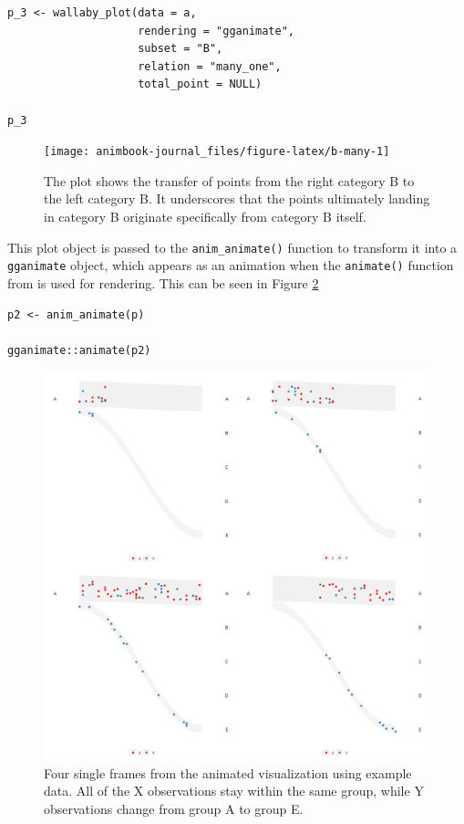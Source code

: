 \begin{verbatim}
p_3 <- wallaby_plot(data = a,
                    rendering = "gganimate",
                    subset = "B",
                    relation = "many_one",
                    total_point = NULL)

p_3
\end{verbatim}

\begin{figure}

{\centering \texttt{[image: animbook-journal\_files/figure-latex/b-many-1]} 

}

\caption{The plot shows the transfer of points from the right category B to the left category B. It underscores that the points ultimately landing in category B originate specifically from category B itself.}\label{fig:b-many}
\end{figure}

This plot object is passed to the \texttt{anim\_animate()} function to transform it into a \texttt{gganimate} object, which appears as an animation when the \texttt{animate()} function from  is used for rendering. This can be seen in Figure \ref{fig:catchange-figure}

\begin{verbatim}
p2 <- anim_animate(p)

gganimate::animate(p2)
\end{verbatim}

\begin{figure}

{\centering \includegraphics[width=1\linewidth]{figures/animation-example} 

}

\caption{Four single frames from the animated visualization using example data. All of the X observations stay within the same group, while Y observations change from group A to group E.}\label{fig:catchange-figure}
\end{figure}

